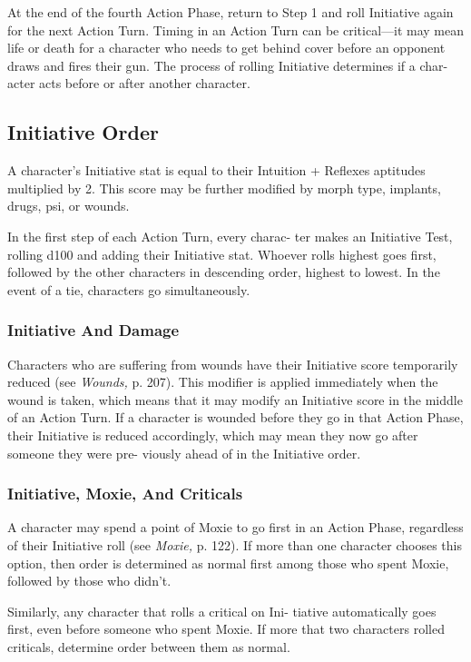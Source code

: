 At the end of the fourth Action Phase, return to Step 
1 and roll Initiative again for the next Action Turn.
Timing in an Action Turn can be critical—it may mean 
life or death for a character who needs to get behind 
cover before an opponent draws and fires their gun. 
The process of rolling Initiative determines if a char-
acter acts before or after another character.

\subsection{Initiative Order}

A character's Initiative stat is equal to their Intuition + 
Reflexes aptitudes multiplied by 2. This score may be 
further modified by morph type, implants, drugs, psi, 
or wounds.

In the first step of each Action Turn, every charac-
ter makes an Initiative Test, rolling d100 and adding 
their Initiative stat. Whoever rolls highest goes first, 
followed by the other characters in descending order, 
highest to lowest. In the event of a tie, characters go 
simultaneously.

\subsubsection{Initiative And Damage}

Characters who are suffering from wounds have their 
Initiative score temporarily reduced (see \textit{Wounds,} p. 
207). This modifier is applied immediately when the 
wound is taken, which means that it may modify an 
Initiative score in the middle of an Action Turn. If a 
character is wounded before they go in that Action 
Phase, their Initiative is reduced accordingly, which 
may mean they now go after someone they were pre-
viously ahead of in the Initiative order.

\subsubsection{Initiative, Moxie, And Criticals}

A character may spend a point of Moxie to go first in 
an Action Phase, regardless of their Initiative roll (see 
\textit{Moxie,} p. 122). If more than one character chooses 
this option, then order is determined as normal first 
among those who spent Moxie, followed by those 
who didn't.

Similarly, any character that rolls a critical on Ini-
tiative automatically goes first, even before someone 
who spent Moxie. If more that two characters rolled 
criticals, determine order between them as normal.

